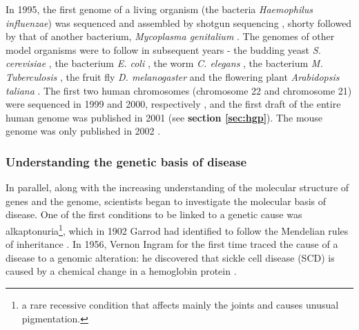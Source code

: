 


 
In 1995, the first genome of a living organism (the bacteria \textit{Haemophilus influenzae}) was sequenced and assembled by shotgun sequencing \cite{fleischmann1995whole}, shorty followed by that of another bacterium, \textit{Mycoplasma genitalium} \cite{fraser1995minimal}. 
The genomes of other model organisms were to follow in subsequent years - the budding yeast \textit{S. cerevisiae} \cite{goffeau1996life}, the bacterium \textit{E. coli} \cite{blattner1997complete}, the worm \textit{C. elegans} \cite{c1998genome}, the bacterium \textit{M. Tuberculosis} \cite{cole1998deciphering}, the fruit fly \textit{D. melanogaster} \cite{adams2000genome} and the flowering plant \textit{Arabidopsis taliana} \cite{kaul2000analysis}.
The first two human chromosomes (chromosome 22 and chromosome 21) were sequenced in 1999 and 2000, respectively \cite{dunham1999dna, hattori2000dna}, and the first draft of the entire human genome was published in 2001 \cite{lander2001initial, venter2001sequence} (see \textbf{section \ref{sec:hgp}}).
The mouse genome was only published in 2002 \cite{waterston2002initial}.

\subsubsection{Understanding the genetic basis of disease}

In parallel, along with the increasing understanding of the molecular structure of genes and the genome, scientists began to investigate the molecular basis of disease.
One of the first conditions to be linked to a genetic cause was alkaptonuria\footnote{a rare recessive condition that affects mainly the joints and causes unusual pigmentation.}, which in 1902 Garrod had identified  to follow the Mendelian rules of inheritance \cite{garrod1902incidence}.
In 1956, Vernon Ingram for the first time traced the cause of a disease to a genomic alteration: he discovered that sickle cell disease (SCD) is caused by a chemical change in a hemoglobin protein \cite{ingram1963hemoglobins}.
\\


